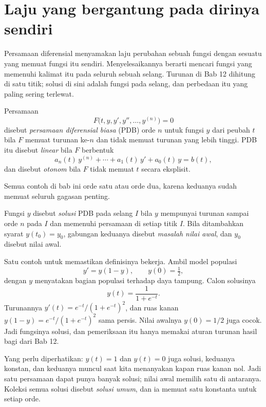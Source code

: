 \section{Laju yang bergantung pada dirinya sendiri}

Persamaan diferensial menyamakan laju perubahan sebuah fungsi dengan sesuatu
yang memuat fungsi itu sendiri. Menyelesaikannya berarti mencari fungsi yang
memenuhi kalimat itu pada seluruh sebuah selang. Turunan di Bab 12 dihitung di
satu titik; solusi di sini adalah fungsi pada selang, dan perbedaan itu yang
paling sering terlewat.

\begin{definisi}
Persamaan
\[
F\bigl(t,y,y',y'',\dots,y^{(n)}\bigr)=0
\]
disebut \emph{persamaan diferensial biasa} (PDB) orde $n$ untuk fungsi $y$ dari
peubah $t$ bila $F$ memuat turunan ke-$n$ dan tidak memuat turunan yang lebih
tinggi. PDB itu disebut \emph{linear} bila $F$ berbentuk
\[
a_{n}(t)\,y^{(n)}+\cdots+a_{1}(t)\,y'+a_{0}(t)\,y=b(t),
\]
dan disebut \emph{otonom} bila $F$ tidak memuat $t$ secara eksplisit.
\end{definisi}

 Semua contoh di
bab ini orde satu atau orde dua, karena keduanya sudah memuat seluruh gagasan
penting.

\begin{definisi}
Fungsi $y$ disebut \emph{solusi} PDB pada selang $I$ bila $y$ mempunyai turunan
sampai orde $n$ pada $I$ dan memenuhi persamaan di setiap titik $I$. Bila
ditambahkan syarat $y(t_{0})=y_{0}$, gabungan keduanya disebut \emph{masalah
nilai awal}, dan $y_{0}$ disebut nilai awal.
\end{definisi}

Satu contoh untuk memastikan definisinya bekerja. Ambil model populasi
\[
y'=y(1-y),\qquad y(0)=\tfrac12 ,
\]
dengan $y$ menyatakan bagian populasi terhadap daya tampung. Calon solusinya
\[
y(t)=\frac{1}{1+e^{-t}} .
\]
Turunannya $y'(t)=e^{-t}/(1+e^{-t})^{2}$, dan ruas kanan
$y(1-y)=e^{-t}/(1+e^{-t})^{2}$ sama persis. Nilai awalnya $y(0)=1/2$ juga cocok.
Jadi fungsinya solusi, dan pemeriksaan itu hanya memakai aturan turunan hasil
bagi dari Bab 12.

Yang perlu diperhatikan: $y(t)=1$ dan $y(t)=0$ juga solusi, keduanya konstan,
dan keduanya muncul saat kita menanyakan kapan ruas kanan nol. Jadi satu
persamaan dapat punya banyak solusi; nilai awal memilih satu di antaranya.
Koleksi semua solusi disebut \emph{solusi umum}, dan ia memuat satu konstanta
untuk setiap orde.

